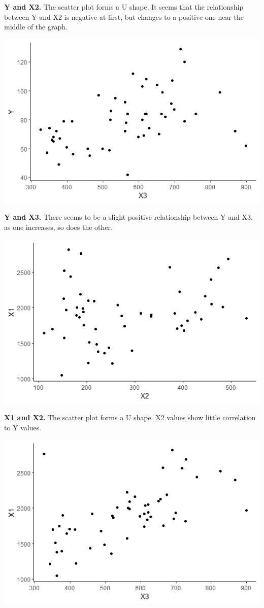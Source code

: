 \documentclass[12pt,letterpaper]{article}
\begin{document}
\begin{itemize}
\textbf{Y and X2.} The scatter plot forms a U shape. It seems that the relationship between Y and X2 is negative at first, but changes to a positive one near the middle of the graph.
\vspace{.5cm}

\includegraphics{YandX3}

\textbf{Y and X3.} There seems to be a slight positive relationship between Y and X3, as one increases, so does the other.
\vspace{.5cm}

\includegraphics{X1andX2}

\textbf{X1 and X2.} The scatter plot forms a U shape. X2 values show little correlation to Y values.
\vspace{.5cm}

\includegraphics{X1andX3}


\end{itemize}
\end{document}
